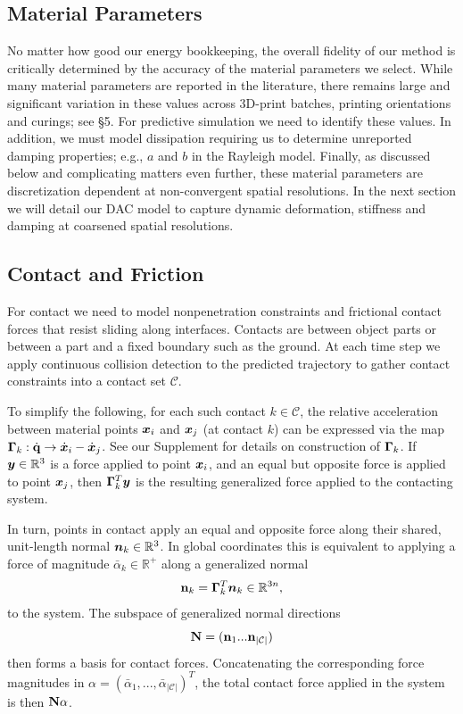 \subsection{Material Parameters}
No matter how good our energy bookkeeping, the overall fidelity of our method is critically determined by the accuracy of the material parameters we select. While many material parameters are reported in the literature, there remains large and significant variation in these values across 3D-print batches, printing orientations and curings; see \S5.
For predictive simulation we need to identify these values. In addition, we must model dissipation requiring us to determine unreported damping properties; e.g., $a$ and $b$ in the Rayleigh model. Finally, as discussed below and complicating matters even further, these material parameters are discretization dependent at non-convergent spatial resolutions. In the next section we will detail our DAC model to capture dynamic deformation, stiffness and damping at coarsened spatial resolutions.

\subsection{Contact and Friction} For contact we need to model nonpenetration constraints and frictional contact forces that resist sliding along interfaces. 
Contacts are between object parts or between a part and a fixed boundary such as the ground.  At each time step we apply continuous collision detection to the predicted trajectory to gather contact constraints into a contact set $\mathcal C$. 

To simplify the following, for each such contact $k \in \mathcal C$, the relative acceleration between material points $\bm{x}_i$ and $\bm{x}_j$ (at contact $k$) can be expressed via the map $\mathbf {\Gamma}_k: \dot{\mathbf {q}} \rightarrow \dot{\bm{x}}_i - \dot{\bm{x}}_j$. See our Supplement
for details on construction of $\mathbf {\Gamma}_k$. If $\bm{y} \in \mathbb{R}^3$ is a force applied to point $\bm{x}_i$, and an equal but opposite force is applied to point $\bm{x}_j$, then $ \mathbf {\Gamma}_k ^T \bm{y}$ is the resulting generalized force applied to the contacting system.

In turn, points in contact apply an equal and opposite force along their shared, unit-length normal $\bm{n}_k \in \mathbb{R}^3$.  In global coordinates this is equivalent to applying a force of magnitude $\bar{\alpha}_k \in \mathbb{R}^+$ along a generalized normal 
\begin{equation}
\mathbf {n}_k = \mathbf {\Gamma}_k^T \bm{n}_k \in \mathbb{R}^{3n},
\end{equation}
to the system. The subspace of generalized normal directions
\begin{equation}
\label{eq:N}
\mathbf {N} = (\mathbf {n}_1 ... \mathbf {n}_{|\mathcal C|})
\end{equation}
then forms a basis for contact forces. Concatenating the corresponding force magnitudes in  
$\alpha = (\bar{\alpha}_1, ..., \bar{\alpha}_{|\mathcal{C}|})^T$, the total contact force applied in the system is then $\mathbf {N} \alpha$. 

